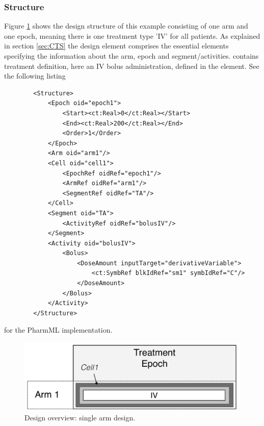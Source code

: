 \subsubsection{Structure}
Figure \ref{fig:1Arm1Epoch_RibbaDesign} shows the design structure of this example 
consisting of one arm and one epoch, meaning there is one treatment type 'IV' for all patients. 
As explained in section \ref{sec:CTS} the design element  comprises the 
essential elements specifying the information about the arm, epoch and segment/activities. 
 contains treatment definition, here an IV bolus administration, 
defined in the  element. 
See the following listing 
\lstset{language=XML}
\begin{lstlisting}
        <Structure>
            <Epoch oid="epoch1">
                <Start><ct:Real>0</ct:Real></Start>
                <End><ct:Real>200</ct:Real></End>
                <Order>1</Order>
            </Epoch>
            <Arm oid="arm1"/>
            <Cell oid="cell1">
                <EpochRef oidRef="epoch1"/>
                <ArmRef oidRef="arm1"/>
                <SegmentRef oidRef="TA"/>
            </Cell>
            <Segment oid="TA">
                <ActivityRef oidRef="bolusIV"/>
            </Segment>
            <Activity oid="bolusIV">
                <Bolus>
                    <DoseAmount inputTarget="derivativeVariable">
                        <ct:SymbRef blkIdRef="sm1" symbIdRef="C"/>
                    </DoseAmount>
                </Bolus>
            </Activity>
        </Structure> 
\end{lstlisting}
for the PharmML implementation.

\begin{figure}[ht!]
\centering
\includegraphics[width=0.7\linewidth]{pics/OneArmOneEpoch_IV}
\caption{Design overview: single arm design.}
\label{fig:1Arm1Epoch_RibbaDesign}
\end{figure}


